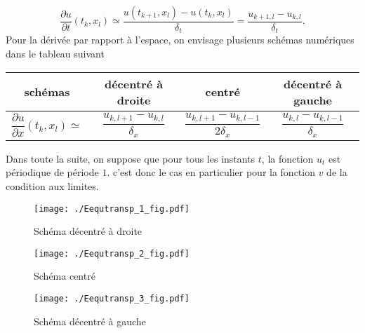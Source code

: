\[
 \frac{\partial u}{\partial t}(t_k,x_l) \simeq \frac{u(t_{k+1},x_l) - u(t_{k},x_l)}{\delta_t} = \frac{u_{k+1,l} - u_{k,l}}{\delta_t}.
\]
Pour la dérivée par rapport à l'espace, on envisage plusieurs schémas numériques dans le tableau suivant
\begin{center}
\renewcommand{\arraystretch}{2.4}
\begin{tabular}{|c|c|c|c|}\hline
schémas                                         & décentré à droite                                    & centré                                                  & décentré à gauche\\ \hline
$\dfrac{\partial u}{\partial x}(t_k,x_l) \simeq$ & $\dfrac{u_{k,l+1} - u_{k,l}}{\delta_x}$ & $\dfrac{u_{k,l+1} - u_{k,l-1}}{2\delta_x}$ & $\dfrac{u_{k,l} - u_{k,l-1}}{\delta_x}$ \\  \hline
\end{tabular}
\end{center}
Dans toute la suite, on suppose que pour tous les instants $t$, la fonction $u_t$ est périodique de période $1$. c'est donc le cas en particulier pour la fonction $v$ de la condition aux limites.
\begin{figure}[h]
 \centering
 \texttt{[image: ./Eequtransp\_1\_fig.pdf]}
 \caption{Schéma décentré à droite}
 \label{fig: Eequtransp_1}
\end{figure}

\begin{figure}[h]
 \centering
 \texttt{[image: ./Eequtransp\_2\_fig.pdf]}
 \caption{Schéma centré}
 \label{fig: Eequtransp_2}
\end{figure}

\begin{figure}[h]
 \centering
 \texttt{[image: ./Eequtransp\_3\_fig.pdf]}
 \caption{Schéma décentré à gauche}
 \label{fig: Eequtransp_3}
\end{figure}

